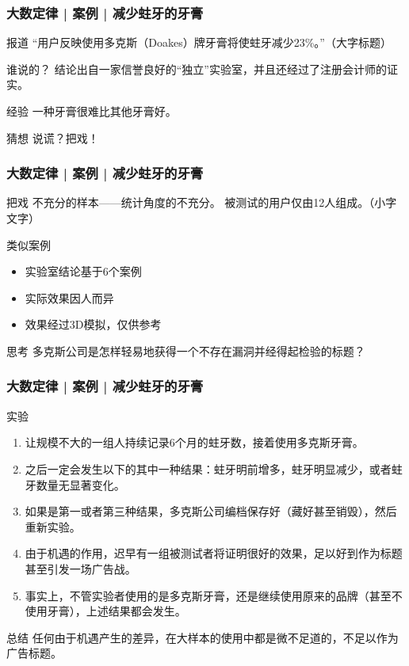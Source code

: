 \begin{frame}
  \frametitle{大数定律 | 案例 | 减少蛀牙的牙膏}
  \begin{block}{报道}
    “用户反映使用多克斯（Doakes）牌牙膏将使蛀牙减少23\%。”（大字标题）
  \end{block}
  \pause
  \begin{block}{谁说的？}
    结论出自一家信誉良好的“独立”实验室，并且还经过了注册会计师的证实。
  \end{block}
  \pause
  \begin{block}{经验}
    一种牙膏很难比其他牙膏好。
  \end{block}
  \pause
  \begin{block}{猜想}
    说谎？把戏！
  \end{block}
\end{frame}

\begin{frame}
  \frametitle{大数定律 | 案例 | 减少蛀牙的牙膏}
  \begin{block}{把戏}
    不充分的样本——统计角度的不充分。
    被测试的用户仅由12人组成。（小字文字）
  \end{block}
  \pause
  \begin{block}{类似案例}
    \begin{itemize}
      \item 实验室结论基于6个案例
      \item 实际效果因人而异
      \item 效果经过3D模拟，仅供参考
    \end{itemize}
  \end{block}
  \pause
  \begin{block}{思考}
    多克斯公司是怎样轻易地获得一个不存在漏洞并经得起检验的标题？
  \end{block}
\end{frame}

\begin{frame}
  \frametitle{大数定律 | 案例 | 减少蛀牙的牙膏}
  \begin{block}{实验}
    \begin{enumerate}
      \item 让规模不大的一组人持续记录6个月的蛀牙数，接着使用多克斯牙膏。
      \item 之后一定会发生以下的其中一种结果：蛀牙明前增多，蛀牙明显减少，或者蛀牙数量无显著变化。
      \item 如果是第一或者第三种结果，多克斯公司编档保存好（藏好甚至销毁），然后重新实验。
      \item 由于机遇的作用，迟早有一组被测试者将证明很好的效果，足以好到作为标题甚至引发一场广告战。
      \item 事实上，不管实验者使用的是多克斯牙膏，还是继续使用原来的品牌（甚至不使用牙膏），上述结果都会发生。
    \end{enumerate}
  \end{block}
  \pause
  \vspace{-0.5em}
  \begin{block}{总结}
    任何由于机遇产生的差异，在大样本的使用中都是微不足道的，不足以作为广告标题。
  \end{block}
\end{frame}

